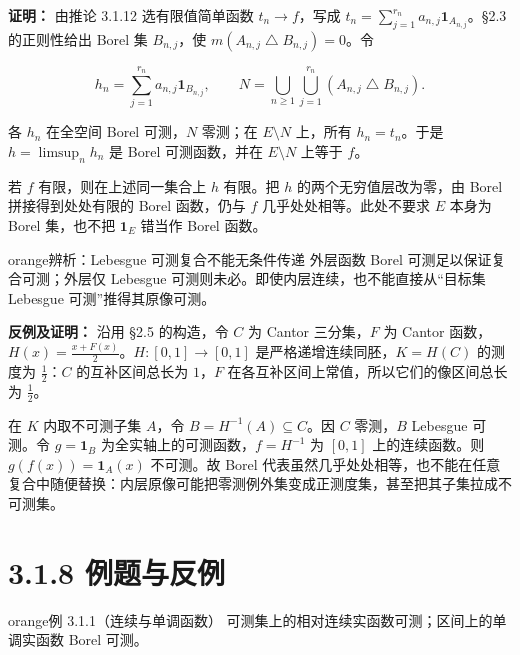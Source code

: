\documentclass[11pt,a4paper]{article}
\begin{document}
\textbf{证明：} 由推论 3.1.12 选有限值简单函数 \(t_n\to f\)，写成
\(t_n=\sum_{j=1}^{r_n}a_{n,j}\mathbf1_{A_{n,j}}\)。§2.3 的正则性给出
Borel 集 \(B_{n,j}\)，使 \(m(A_{n,j}\mathbin\triangle B_{n,j})=0\)。令

\begin{equation*}
h_n=\sum_{j=1}^{r_n}a_{n,j}\mathbf1_{B_{n,j}},\qquad
N=\bigcup_{n\ge1}\bigcup_{j=1}^{r_n}(A_{n,j}\mathbin\triangle B_{n,j}).
\tag{3.1.10}
\end{equation*}

各 \(h_n\) 在全空间 Borel 可测，\(N\) 零测；在 \(E\setminus N\) 上，所有
\(h_n=t_n\)。于是 \(h=\limsup_n h_n\) 是 Borel 可测函数，并在
\(E\setminus N\) 上等于 \(f\)。

若 \(f\) 有限，则在上述同一集合上 \(h\) 有限。把 \(h\)
的两个无穷值层改为零，由 Borel 拼接得到处处有限的 Borel 函数，仍与 \(f\)
几乎处处相等。此处不要求 \(E\) 本身为 Borel 集，也不把 \(\mathbf1_E\)
错当作 Borel 函数。

\begin{sboxenv}{orange}{辨析：Lebesgue 可测复合不能无条件传递}
外层函数 Borel 可测足以保证复合可测；外层仅 Lebesgue
可测则未必。即使内层连续，也不能直接从``目标集 Lebesgue
可测''推得其原像可测。

\end{sboxenv}

\textbf{反例及证明：} 沿用 §2.5 的构造，令 \(C\) 为 Cantor 三分集，\(F\)
为 Cantor 函数，\(H(x)=\frac{x+F(x)}2\)。\(H:[0,1]\to[0,1]\)
是严格递增连续同胚，\(K=H(C)\) 的测度为 \(\frac12\)：\(C\)
的互补区间总长为 \(1\)，\(F\) 在各互补区间上常值，所以它们的像区间总长为
\(\frac12\)。

在 \(K\) 内取不可测子集 \(A\)，令 \(B=H^{-1}(A)\subseteq C\)。因 \(C\)
零测，\(B\) Lebesgue 可测。令 \(g=\mathbf1_B\)
为全实轴上的可测函数，\(f=H^{-1}\) 为 \([0,1]\) 上的连续函数。则
\(g(f(x))=\mathbf1_A(x)\) 不可测。故 Borel
代表虽然几乎处处相等，也不能在任意复合中随便替换：内层原像可能把零测例外集变成正测度集，甚至把其子集拉成不可测集。

\section[\S{}3.1.8 例题与反例]{3.1.8 例题与反例}\label{ux4f8bux9898ux4e0eux53cdux4f8b}

\begin{sboxenv}{orange}{例 3.1.1（连续与单调函数）}
可测集上的相对连续实函数可测；区间上的单调实函数 Borel 可测。

\end{sboxenv}
\end{document}
